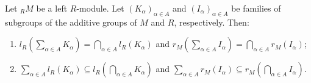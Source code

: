 Let ${}_R M$ be a left $R$-module. Let $(K_\alpha)_{\alpha \in A}$ and $(I_\alpha)_{\alpha \in A}$ be families of subgroups of the additive groups of $M$ and $R$, respectively. Then:

\begin{enumerate}
\item $l_R\!\left(\sum_{\alpha \in A} K_\alpha\right) = \bigcap_{\alpha \in A} l_R(K_\alpha)$ and $r_M\!\left(\sum_{\alpha \in A} I_\alpha\right) = \bigcap_{\alpha \in A} r_M(I_\alpha)$;
\item $\sum_{\alpha \in A} l_R(K_\alpha) \subseteq l_R\!\left(\bigcap_{\alpha \in A} K_\alpha\right)$ and $\sum_{\alpha \in A} r_M(I_\alpha) \subseteq r_M\!\left(\bigcap_{\alpha \in A} I_\alpha\right)$.
\end{enumerate}
